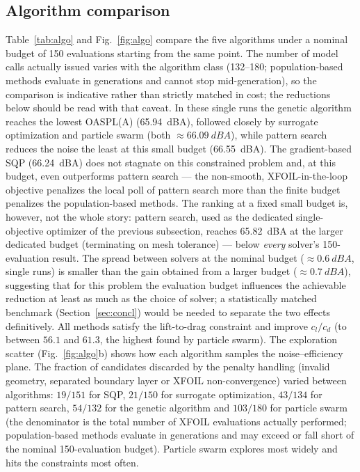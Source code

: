 \documentclass[preprint,3p,times]{elsarticle}
\begin{document}
\subsection{Algorithm comparison}\label{sec:algos}
Table~\ref{tab:algo} and Fig.~\ref{fig:algo} compare the five algorithms under
a nominal budget of 150 evaluations starting from the same point. The number
of model calls actually issued varies with the algorithm class
(132--180; population-based methods evaluate in generations and cannot stop
mid-generation), so the comparison is indicative rather than strictly
matched in cost; the reductions below should be read with that caveat.
In these single runs the genetic algorithm reaches the lowest OASPL(A)
(\SI{65.94}{dBA}), followed
closely by surrogate optimization and particle swarm (both
$\approx\SI{66.09}{dBA}$), while pattern search reduces
the noise the least at this small budget (\SI{66.55}{dBA}). The gradient-based
SQP (\SI{66.24}{dBA}) does not stagnate on this constrained problem and, at this
budget, even outperforms pattern search --- the non-smooth, XFOIL-in-the-loop
objective penalizes the local poll of pattern search more than the finite
budget penalizes the population-based methods. The ranking at a fixed small
budget is, however, not the whole story: pattern search, used as the dedicated
single-objective optimizer of the previous subsection, reaches \SI{65.82}{dBA}
at the larger dedicated budget (terminating on mesh tolerance) --- below
\emph{every} solver's 150-evaluation result. The spread between solvers at the
nominal budget ($\approx\SI{0.6}{dBA}$, single runs) is smaller than the gain
obtained from a larger budget ($\approx\SI{0.7}{dBA}$), suggesting that for
this problem the evaluation budget influences the achievable reduction at
least as much as the choice of solver; a statistically matched benchmark
(Section~\ref{sec:concl}) would be needed to separate the two effects
definitively. All methods satisfy the lift-to-drag
constraint and improve
$c_l/c_d$ (to between $56.1$ and $61.3$, the highest found by particle swarm).
The exploration scatter (Fig.~\ref{fig:algo}b) shows how each algorithm samples
the noise--efficiency plane. The fraction of candidates discarded by the penalty
handling (invalid geometry, separated boundary layer or XFOIL non-convergence)
varied between algorithms: $19/151$ for SQP, $21/150$ for surrogate
optimization, $43/134$ for pattern search, $54/132$ for the genetic algorithm
and $103/180$ for particle swarm (the denominator is the total number of XFOIL
evaluations actually performed; population-based methods evaluate in generations
and may exceed or fall short of the nominal 150-evaluation budget). Particle
swarm explores most widely and hits the constraints most often.
\end{document}
